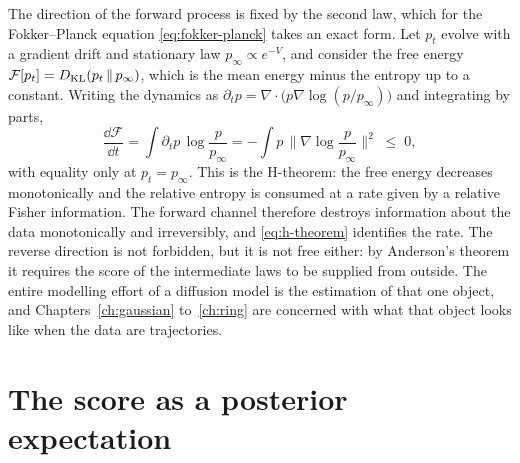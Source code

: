 The direction of the forward process is fixed by the second law, which for the
Fokker--Planck equation \eqref{eq:fokker-planck} takes an exact form. Let $p_t$
evolve with a gradient drift and stationary law $p_\infty \propto e^{-V}$, and
consider the free energy $\mathcal F[p_t] = D_{\mathrm{KL}}\!\left(p_t \,\|\, p_\infty\right)$, which is the
mean energy minus the entropy up to a constant. Writing the dynamics as
$\partial_t p = \nabla \cdot \big(p \nabla \log (p/p_\infty)\big)$ and
integrating by parts,
\begin{equation}
  \frac{\dd \mathcal F}{\dd t}
  = \int \partial_t p \, \log \frac{p}{p_\infty}
  = -\int p \,\Big\| \nabla \log \frac{p}{p_\infty} \Big\|^2 \;\le\; 0 ,
  \label{eq:h-theorem}
\end{equation}
with equality only at $p_t = p_\infty$. This is the H-theorem: the free energy
decreases monotonically and the relative entropy is consumed at a rate given by
a relative Fisher information. The forward channel therefore destroys
information about the data monotonically and irreversibly, and
\eqref{eq:h-theorem} identifies the rate. The reverse direction is not
forbidden, but it is not free either: by Anderson's theorem it requires the
score of the intermediate laws to be supplied from outside. The entire
modelling effort of a diffusion model is the estimation of that one object, and
Chapters~\ref{ch:gaussian} to~\ref{ch:ring} are concerned with what that object
looks like when the data are trajectories.

\section{The score as a posterior expectation}\label{sec:tweedie}


